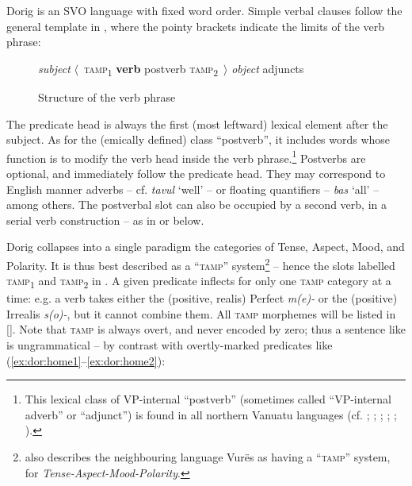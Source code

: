 \documentclass[output=paper,colorlinks,citecolor=brown,draft]{langscibook}
\begin{document}
Dorig is an SVO language with fixed word order. Simple verbal clauses follow the general template in , where the pointy brackets indicate the limits of the verb phrase:

\begin{figure}
\centering
\textit{subject} \textrm{\textbf{${\langle}$}}~\textsc{tamp}\textsubscript{1} \textbf{verb} postverb \textsc{tamp}\textsubscript{2}~\textrm{\textbf{${\rangle}$}} \textit{object} adjuncts 
\caption{Structure of the verb phrase} 
\label{fig:dor:order}
\end{figure}

The predicate head is always the first (most leftward) lexical element after the subject. As for the (emically defined) class “postverb”, it includes words whose function is to modify the verb head inside the verb phrase.\footnote{This lexical class of VP-internal “postverb” (sometimes called “VP-internal adverb” or “\mbox{adjunct}”) is found in all northern Vanuatu languages (cf. \citealt[137--142]{François2004}; \citealt[316]{François2017}; \citealt[91]{Schnell2011}; \citealt[122--124]{Malau2016}; \citealt{Rangelov2022}; \citealt{FrançoisKrausseFC}).} Postverbs are optio\-nal, and immediately follow the predicate head. They may correspond to English manner adverbs – cf.  \textit{tavul} ‘well’ – or floating quantifiers –  \textit{bas} ‘all’ – among others. The postverbal slot can also be occupied by a second verb, in a serial verb construction – as in  or  below. 

Dorig collapses into a single paradigm the categories of Tense, Aspect, Mood, and Polarity. It is thus best described as a “\textsc{tamp}” system\footnote{\citet[461]{Malau2016} also describes the neighbouring language Vurës as having a “\textsc{tamp}” system, for \textit{Tense-Aspect-Mood-Polarity}.} – hence the slots label\-led \textsc{tamp}\textsubscript{1} and \textsc{tamp}\textsubscript{2} in . A given predicate inflects for only one \textsc{tamp} category at a time: e.g. a verb takes either the (positive, realis) Perfect \textit{m(e)-} or the (positive) Irrealis \textit{s(o)-}, but it cannot combine them. All \textsc{tamp} morphemes will be listed in  []. Note that \textsc{tamp} is always overt, and never encoded by zero; thus a sentence like  is ungrammatical – by contrast with overtly-marked predicates like (\ref{ex:dor:home1}--\ref{ex:dor:home2}):
\end{document}
